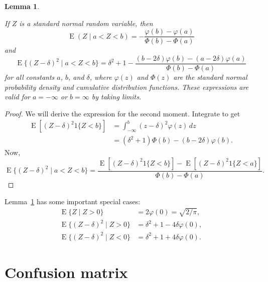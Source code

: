 \documentclass[12pt]{article}
\newtheorem{lemma}{Lemma}
\newcommand{\E}{\operatorname{E}}
\begin{document}
\begin{lemma}\label{lem:truncated-normal-moments}

If $Z$ is a standard normal random variable, then
\[
  \E(Z \mid a < Z < b)
    = - \frac{\varphi(b) - \varphi(a)}
             {\Phi(b) - \Phi(a)}
\]
and
\[
  \E\{(Z - \delta)^2 \mid a < Z < b\}
    = \delta^2 + 1
    - \frac{  (b - 2 \delta) \varphi(b)
            - (a - 2 \delta) \varphi(a)}
           {\Phi(b) - \Phi(a)}
\]
for all constants $a$, $b$, and $\delta$, where $\varphi(z)$ and $\Phi(z)$ are
the standard normal probability density and cumulative distribution functions.
These expressions are valid for $a = -\infty$ or $b = \infty$ by taking
limits.

\end{lemma}
\begin{proof}
We will derive the expression for the second moment.  Integrate to get
\begin{align*}
  \E[ (Z - \delta)^2 1\{Z < b\}]
    &= \int_{-\infty}^b (z - \delta)^2 \varphi(z) \, dz \\
    &= (\delta^2 + 1) \Phi(b) - (b - 2 \delta) \varphi(b).
\end{align*}
Now,
\[
  \E\{(Z - \delta)^2 \mid a < Z < b\}
    =
    \frac{  \E[ (Z - \delta)^2 1\{Z < b\}]
          - \E[ (Z - \delta)^2 1\{Z < a\}]}
         { \Phi(b) - \Phi(a) }.
\]
\end{proof}

Lemma~\ref{lem:truncated-normal-moments} has some important special cases:
\begin{align*}
  \E\{Z \mid Z > 0\} &= 2 \varphi(0) = \sqrt{2 / \pi}, \\
  \E\{(Z - \delta)^2 \mid Z > 0 \}
    &= \delta^2 + 1 - 4 \delta \varphi(0), \\
  \E\{(Z - \delta)^2 \mid Z < 0 \}
    &= \delta^2 + 1 + 4 \delta \varphi(0).
\end{align*}

\section{Confusion matrix} \label{app:confusion}
\end{document}

